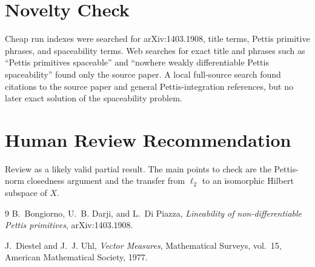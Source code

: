 \documentclass[11pt]{article}
\begin{document}
\section*{Novelty Check}

Cheap run indexes were searched for arXiv:1403.1908, title terms, Pettis
primitive phrases, and spaceability terms.  Web searches for exact title and
phrases such as ``Pettis primitives spaceable'' and ``nowhere weakly
differentiable Pettis spaceability'' found only the source paper.  A local
full-source search found citations to the source paper and general
Pettis-integration references, but no later exact solution of the spaceability
problem.

\section*{Human Review Recommendation}

Review as a likely valid partial result.  The main points to check are the
Pettis-norm closedness argument and the transfer from \(\ell_2\) to an
isomorphic Hilbert subspace of \(X\).

\begin{thebibliography}{9}
B.~Bongiorno, U.~B. Darji, and L.~Di Piazza,
\emph{Lineability of non-differentiable Pettis primitives},
arXiv:1403.1908.

J.~Diestel and J.~J. Uhl,
\emph{Vector Measures},
Mathematical Surveys, vol.~15, American Mathematical Society, 1977.
\end{thebibliography}
\end{document}
